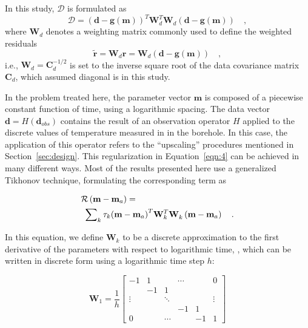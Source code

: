\documentclass[cp]{copernicus}
\begin{document}
In this study, $\mathcal{D}$ is formulated as
\begin{equation} 
\mathcal{D} = 
 \left(\mathbf{d} - \mathbf{g(m)}\right)^T \mathbf{W}_d^T 
 \mathbf{W}_d^{}\left(\mathbf{d} - \mathbf{g(m)} \right)\quad,
\end{equation} 
\noindent where $\mathbf{W}_d$ denotes a weighting matrix commonly used to define the weighted 
residuals 
\begin{equation*}
\tilde{ \mathbf{r}} =\mathbf{W}_d^{}\mathbf{r} = 
\mathbf{W}_d^{} \left(\mathbf{d}-\mathbf{g}(\mathbf{m})\right)\quad, 
\end{equation*}
\noindent i.e., $\mathbf{W}_d = \mathbf{C}_d^{-1/2}$ is set to the inverse square root of the data 
covariance matrix $\mathbf{C}_d$, which assumed diagonal is in this study. 

In the problem treated here, the parameter vector $\mathbf{m}$ is composed of a piecewise constant 
function of time, using a logarithmic spacing. The data vector $\mathbf{d} = H(\mathbf{d}_{obs})$ 
contains the result of an observation operator $H$ applied to the discrete values of temperature 
measured in in the borehole. In this case, the application of this operator refers to the 
“upscaling” procedures mentioned in Section~\ref{sec:design}. This regularization in 
Equation~\ref{eqn:4} can be achieved in many different ways. Most of the results presented here use 
a generalized Tikhonov technique, formulating the corresponding term as

\begin{equation}
\label{eqn:5}
\begin{gathered}
 \mathcal{R}\left( {{\mathbf{m}} - {{\mathbf{m}}_a}} \right) = \hfill \\
 {\text{ }}\sum\nolimits_k {{\tau _k}} {\left( {{\mathbf{m}} - {{\mathbf{m}}_a}} 
\right)^T}{\mathbf{W}}_k^T{\mathbf{W}}_k^{}\left( {{\mathbf{m}} - {{\mathbf{m}}_a}} \right) \quad. 
\hfill \\ 
\end{gathered} 
\end{equation} 

In this equation, we define $\mathbf{W}_k$ to be a discrete approximation to the first derivative 
of the parameters with respect to logarithmic time, \cite[see][]{Aster2019a}, which can be written 
in discrete form using a logarithmic time step $h$:
 	 
\begin{equation}\label{eqn:6}
{{\mathbf{W}}_1} = \frac{1}{h}\left[ {\begin{array}{*{20}{c}}
 { - 1}&1&{}& \cdots &{}&0 \\ 
 {}&{ - 1}&1&{}&{}&{} \\ 
 \vdots &{}& \ddots &{}&{}& \vdots \\ 
 {}&{}&{}&{ - 1}&1&{} \\ 
 0&{}& \cdots &{}&{ - 1}&1 
\end{array}} \right]\end{equation} 
\end{document}
